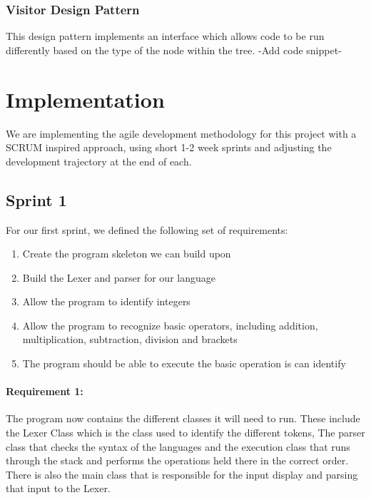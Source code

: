 \documentclass[a4paper, oneside, 11pt]{report}
\begin{document}
\subsection{Visitor Design Pattern}

This design pattern implements an interface which allows code to be run differently based
on the type of the node within the tree.
-Add code snippet-







\chapter{Implementation}\label{Impl}

We are implementing the agile development methodology for this project with a SCRUM inspired approach, using short 1-2 week sprints and adjusting the development trajectory at the end of each.

\section{Sprint 1}

For our first sprint, we defined the following set of requirements: 

\begin{enumerate}
\item Create the program skeleton we can build upon 
\item Build the Lexer and parser for our language 
\item Allow the program to identify integers 
\item Allow the program to recognize basic operators, including addition, multiplication, subtraction, division and brackets 
\item The program should be able to execute the basic operation is can identify 
\end{enumerate}

\subsubsection{Requirement 1:}

The program now contains the different classes it will need to run. These include the Lexer Class which is the class used to identify the different tokens, The parser class that checks the syntax of the languages and the execution class that runs through the stack and performs the operations held there in the correct order. There is also the main class that is responsible for the input display and parsing that input to the Lexer. 
\end{document}
